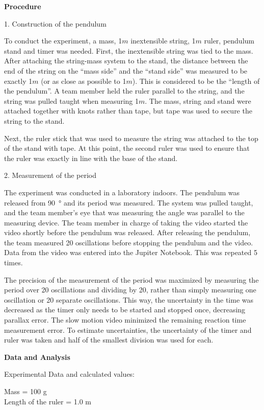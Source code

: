 \textbf{Procedure}

1. Construction of the pendulum

To conduct the experiment, a mass, 1$\si{m}$ inextensible string, 1$\si{m}$ ruler, pendulum stand and timer was needed. First, the inextensible string was tied to the mass. After attaching the string-mass system to the stand, the distance between the end of the string on the ``mass side'' and the ``stand side'' was measured to be exactly 1$\si{m}$ (or as close as possible to 1$\si{m}$). This is considered to be the ``length of the pendulum''. A team member held the ruler parallel to the string, and the string was pulled taught when measuring 1$\si{m}$. The mass, string and stand were attached together with knots rather than tape, but tape was used to secure the string to the stand.

Next, the ruler stick that was used to measure the string was attached to the top of the stand with tape. At this point, the second ruler was used to ensure that the ruler was exactly in line with the base of the stand.

2. Measurement of the period

The experiment was conducted in a laboratory indoors. The pendulum was released from \SI{90}{\degree} and its period was measured. The system was pulled taught, and the team member's eye that was measuring the angle was parallel to the measuring device. The team member in charge of taking the video started the video shortly before the pendulum was released. After releasing the pendulum, the team measured 20 oscillations before stopping the pendulum and the video. Data from the video was entered into the Jupiter Notebook. This was repeated 5 times.

The precision of the measurement of the period was maximized by measuring the period over 20 oscillations and dividing by 20, rather than simply measuring one oscillation or 20 separate oscillations. This way, the uncertainty in the time was decreased as the timer only needs to be started and stopped once, decreasing parallax error. The slow motion video minimized the remaining reaction time measurement error. To estimate uncertainties, the uncertainty of the timer and ruler was taken and half of the smallest division was used for each.

\textbf{Data and Analysis}

Experimental Data and calculated values:

Mass = 100 g
\\ Length of the ruler = 1.0 m

